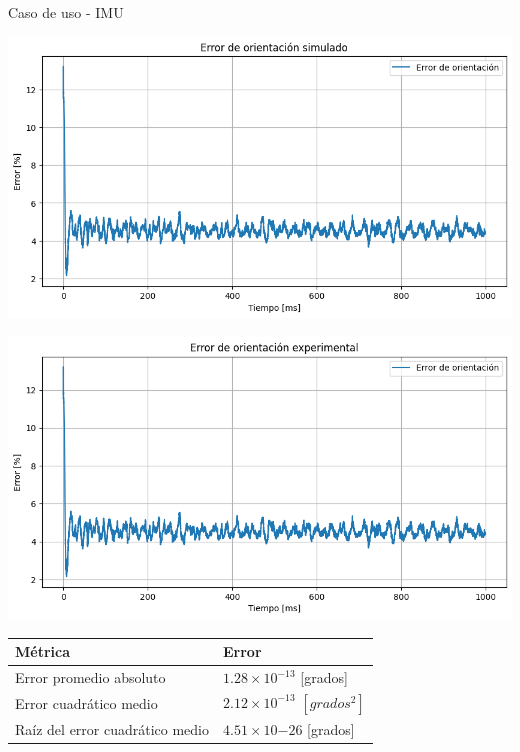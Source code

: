\documentclass[10pt,aspectratio=169]{beamer} %
\begin{document}
\begin{frame}{Caso de uso - IMU}
  \centering
  \begin{minipage}{0.45\linewidth}
    \centering
    \includegraphics[scale=0.2]{IMU/simulated/error_de_orientacion_simulado.png}
  \end{minipage}%
  \hfill
  \begin{minipage}{0.45\linewidth}
    \centering
    \includegraphics[scale=0.2]{IMU/experimental/error_de_orientacion.png}
  \end{minipage}

  \vspace{0.5cm} %

  
    \begin{minipage}{0.9\linewidth} %
      \centering
      \begin{tabular}{ll}
        Métrica                       & Error \\ \hline
        Error promedio absoluto         &   $1.28 \times 10^{-13}$ [grados]\\
        Error cuadrático medio          &   $2.12 \times 10^{-13}$ $[grados^{2}]$    \\
        Raíz del error cuadrático medio &   $4.51 \times 10{-26}$ [grados]  
        \end{tabular}
    \end{minipage}
\end{frame}
\end{document}
